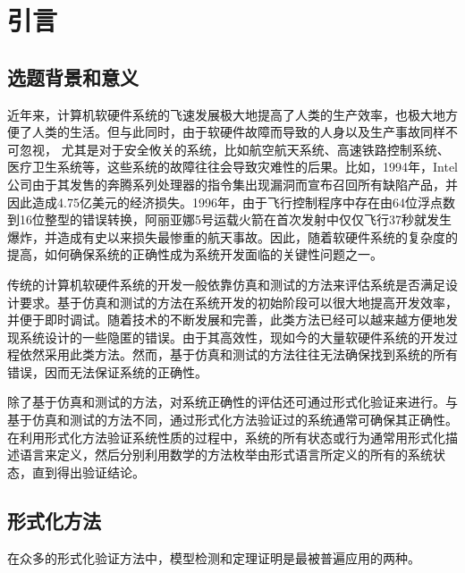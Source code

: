 \chapter{引言}\label{chapt:intro}
\section{选题背景和意义}
近年来，计算机软硬件系统的飞速发展极大地提高了人类的生产效率，也极大地方便了人类的生活。但与此同时，由于软硬件故障而导致的人身以及生产事故同样不可忽视，
尤其是对于安全攸关的系统，比如航空航天系统、高速铁路控制系统、医疗卫生系统等，这些系统的故障往往会导致灾难性的后果。比如，1994年，Intel公司由于其发售的奔腾系列处理器的指令集出现漏洞而宣布召回所有缺陷产品，并因此造成4.75亿美元的经济损失。1996年，由于飞行控制程序中存在由64位浮点数到16位整型的错误转换，阿丽亚娜5号运载火箭在首次发射中仅仅飞行37秒就发生爆炸，并造成有史以来损失最惨重的航天事故。因此，随着软硬件系统的复杂度的提高，如何确保系统的正确性成为系统开发面临的关键性问题之一。

传统的计算机软硬件系统的开发一般依靠仿真和测试的方法来评估系统是否满足设计要求。基于仿真和测试的方法在系统开发的初始阶段可以很大地提高开发效率，并便于即时调试。随着技术的不断发展和完善，此类方法已经可以越来越方便地发现系统设计的一些隐匿的错误。由于其高效性，现如今的大量软硬件系统的开发过程依然采用此类方法。然而，基于仿真和测试的方法往往无法确保找到系统的所有错误，因而无法保证系统的正确性。

除了基于仿真和测试的方法，对系统正确性的评估还可通过形式化验证来进行。与基于仿真和测试的方法不同，通过形式化方法验证过的系统通常可确保其正确性。在利用形式化方法验证系统性质的过程中，系统的所有状态或行为通常用形式化描述语言来定义，然后分别利用数学的方法枚举由形式语言所定义的所有的系统状态，直到得出验证结论。
\section{形式化方法}
在众多的形式化验证方法中，模型检测和定理证明是最被普遍应用的两种。

